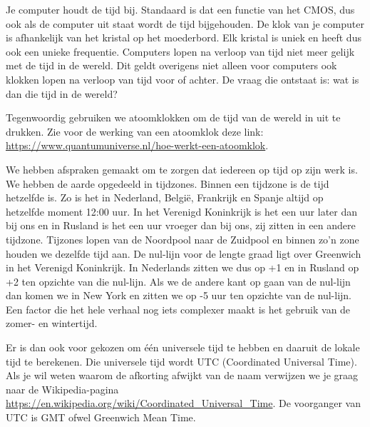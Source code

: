 Je computer houdt de tijd bij. Standaard is dat een functie van het CMOS, dus ook als de computer uit staat wordt de tijd bijgehouden. De klok van je computer is afhankelijk van het kristal op het moederbord. Elk kristal is uniek en heeft dus ook een unieke frequentie. Computers lopen na verloop van tijd niet meer gelijk met de tijd in de wereld. Dit geldt overigens niet alleen voor computers ook klokken lopen na verloop van tijd voor of achter. De vraag die ontstaat is: wat is dan die tijd in de wereld?

Tegenwoordig gebruiken we atoomklokken om de tijd van de wereld in uit te drukken. Zie voor de werking van een atoomklok deze link: \url{https://www.quantumuniverse.nl/hoe-werkt-een-atoomklok}.

We hebben afspraken gemaakt om te zorgen dat iedereen op tijd op zijn werk is. We hebben de aarde opgedeeld in tijdzones. Binnen een tijdzone is de tijd hetzelfde is. Zo is het in Nederland, Belgi\"e, Frankrijk en Spanje altijd op hetzelfde moment 12:00 uur. In het Verenigd Koninkrijk is het een uur later dan bij ons en in Rusland is het een uur vroeger dan bij ons, zij zitten in een andere tijdzone. Tijzones lopen van de Noordpool naar de Zuidpool en binnen zo'n zone houden we dezelfde tijd aan. De nul-lijn voor de lengte graad ligt over Greenwich in het Verenigd Koninkrijk. In Nederlands zitten we dus op +1 en in Rusland op +2 ten opzichte van die nul-lijn. Als we de andere kant op gaan van de nul-lijn dan komen we in New York en zitten we op -5 uur ten opzichte van de nul-lijn. Een factor die het hele verhaal nog iets complexer maakt is het gebruik van de zomer- en wintertijd.

Er is dan ook voor gekozen om \'e\'en universele tijd te hebben en daaruit de lokale tijd te berekenen. Die universele tijd wordt UTC (Coordinated Universal Time). Als je wil weten waarom de afkorting afwijkt van de naam verwijzen we je graag naar de Wikipedia-pagina \url{https://en.wikipedia.org/wiki/Coordinated_Universal_Time}. De voorganger van UTC is GMT ofwel Greenwich Mean Time.

